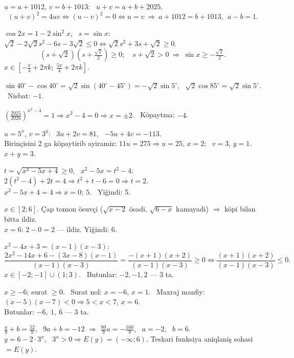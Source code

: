 $u=a+1012$, $v=b+1013$: \ $u+v=a+b+2025$.
\[(u+v)^2=4uv\iff(u-v)^2=0\iff u=v\ \Rightarrow\ a+1012=b+1013,\ \ a-b=1.\]

$\cos2x=1-2\sin^2x$, \ $s=\sin x$: \ $\sqrt2-2\sqrt2s^2-6s-3\sqrt2\le0\iff\sqrt2s^2+3s+\sqrt2\ge0$.
\[(s+\sqrt2)\left(s+\tfrac{\sqrt2}2\right)\ge0;\quad s+\sqrt2>0\ \Rightarrow\ \sin x\ge-\tfrac{\sqrt2}2.\]
$x\in\left[-\frac\pi4+2\pi k;\ \frac{5\pi}4+2\pi k\right]$.

$\sin40^\circ-\cos40^\circ=\sqrt2\sin(40^\circ-45^\circ)=-\sqrt2\sin5^\circ$, \ $\sqrt2\cos85^\circ=\sqrt2\sin5^\circ$. \ Nisbat: $-1$.

$\left(\frac{2025}{2026}\right)^{x^2-4}=1\Rightarrow x^2-4=0\Rightarrow x=\pm2$. \ Köpaytma: $-4$.

$u=5^x$, $v=3^y$: \ $3u+2v=81$, \ $-5u+4v=-113$.\\
Birinçisini 2 ga köpaytirib ayiramiz: $11u=275\Rightarrow u=25$, $x=2$; \ $v=3$, $y=1$. \ $x+y=3$.

$t=\sqrt{x^2-5x+4}\ge0$, \ $x^2-5x=t^2-4$: \ $2(t^2-4)+2t=4\Rightarrow t^2+t-6=0\Rightarrow t=2$.\\
$x^2-5x+4=4\Rightarrow x=0;\ 5$. \ Yiğindi: 5.

$x\in[2;6]$. Çap tomon ösuvçi ($\sqrt{x-2}$ ösadi, $\sqrt{6-x}$ kamayadi) $\Rightarrow$ köpi bilan bitta ildiz.\\
$x=6$: $2-0=2$ — ildiz. Yiğindi: 6.

$x^2-4x+3=(x-1)(x-3)$:
\[\frac{2x^2-14x+6-(3x-8)(x-1)}{(x-1)(x-3)}=\frac{-(x+1)(x+2)}{(x-1)(x-3)}\ge0\iff\frac{(x+1)(x+2)}{(x-1)(x-3)}\le0.\]
$x\in[-2;-1]\cup(1;3)$. \ Butunlar: $-2,-1,2$ — 3 ta.

$x\ge-6$; surat $\ge0$. \ Surat nol: $x=-6$, $x=1$. \ Maxraj manfiy: $(x-5)(x-7)<0\Rightarrow5<x<7$, $x=6$.\\
Butunlar: $-6,\ 1,\ 6$ — 3 ta.

$\frac a9+b=\frac{52}9$, \ $9a+b=-12$ $\Rightarrow$ $\frac{80}9a=-\frac{160}9$, \ $a=-2$, \ $b=6$.\\
$y=6-2\cdot3^x$, \ $3^x>0\Rightarrow E(y)=(-\infty;6)$. Teskari funksiya aniqlaniş sohasi $=E(y)$.

